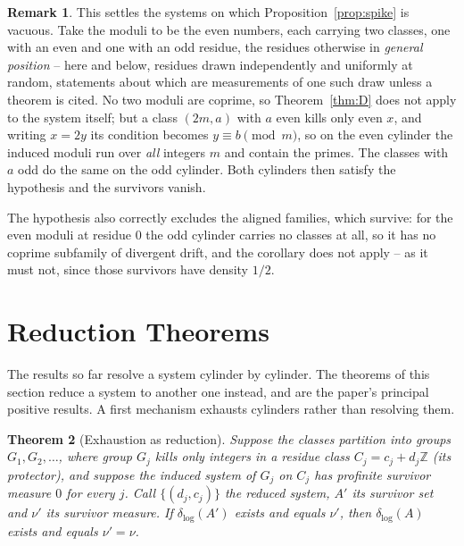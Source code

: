 \documentclass[11pt]{article}
\theoremstyle{plain}
\newtheorem{theorem}{Theorem}[section]
\theoremstyle{definition}
\newtheorem{remark}[theorem]{Remark}
\newcommand{\dlog}{\delta_{\log}}
\begin{document}
\begin{remark}
This settles the systems on which
Proposition~\ref{prop:spike} is vacuous.  Take the moduli to be
the even numbers, each carrying two classes, one with an even
and one with an odd residue, the residues otherwise in
\emph{general position} -- here and below, residues drawn
independently and uniformly at random, statements about which
are measurements of one such draw unless a theorem is cited.  No two moduli are
coprime, so Theorem~\ref{thm:D} does not apply to the system
itself; but a class $(2m,a)$ with $a$ even kills only even $x$,
and writing $x=2y$ its condition becomes $y\equiv b\pmod m$, so
on the even cylinder the induced moduli run over \emph{all}
integers $m$ and contain the primes.  The classes with $a$ odd do
the same on the odd cylinder.  Both cylinders then satisfy the
hypothesis and the survivors vanish.

The hypothesis also correctly excludes the aligned families,
which survive: for the even moduli at residue $0$ the odd
cylinder carries no classes at all, so it has no coprime
subfamily of divergent drift, and the corollary does not apply --
as it must not, since those survivors have density $1/2$.
\end{remark}

\section{Reduction Theorems}\label{sec:reductions}

The results so far resolve a system cylinder by cylinder.  The
theorems of this section reduce a system to another one instead,
and are the paper's principal positive results.  A first
mechanism exhausts cylinders rather than resolving them.

\begin{theorem}[Exhaustion as reduction]\label{thm:exhaust}
Suppose the classes partition into groups $G_1,G_2,\dots$, where
group $G_j$ kills only integers in a residue class
$C_j=c_j+d_j\mathbb{Z}$ (its \emph{protector}), and suppose the induced system of
$G_j$ on $C_j$ has profinite survivor measure $0$ for every $j$.
Call $\{(d_j,c_j)\}$ the \emph{reduced system}, $A'$ its
survivor set and $\nu'$ its survivor measure.  If $\dlog(A')$
exists and equals $\nu'$, then $\dlog(A)$ exists and equals
$\nu'=\nu$.
\end{theorem}
\end{document}
